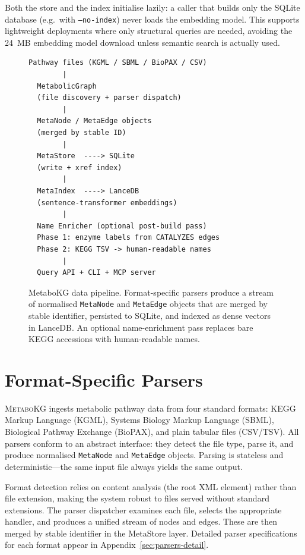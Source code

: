 \documentclass[10pt]{article}
\begin{document}
Both the store and the index initialise lazily: a caller that builds only the
SQLite database (e.g.\ with \texttt{--no-index}) never loads the embedding
model. This supports lightweight deployments where only structural queries are
needed, avoiding the 24~MB embedding model download unless semantic search is
actually used.

\begin{figure}[H]
  \centering
  \begin{lstlisting}[style=bash, frame=single, caption={High-level data flow.}]
Pathway files (KGML / SBML / BioPAX / CSV)
        |
  MetabolicGraph
  (file discovery + parser dispatch)
        |
  MetaNode / MetaEdge objects
  (merged by stable ID)
        |
  MetaStore  ----> SQLite
  (write + xref index)
        |
  MetaIndex  ----> LanceDB
  (sentence-transformer embeddings)
        |
  Name Enricher (optional post-build pass)
  Phase 1: enzyme labels from CATALYZES edges
  Phase 2: KEGG TSV -> human-readable names
        |
  Query API + CLI + MCP server
  \end{lstlisting}
  \caption{MetaboKG data pipeline. Format-specific parsers produce a stream of
  normalised \texttt{MetaNode} and \texttt{MetaEdge} objects that are merged
  by stable identifier, persisted to SQLite, and indexed as dense vectors in
  LanceDB. An optional name-enrichment pass replaces bare KEGG accessions with
  human-readable names.}
  \label{fig:arch}
\end{figure}

\section{Format-Specific Parsers}
\label{sec:parsers}

\textsc{MetaboKG} ingests metabolic pathway data from four standard formats:
KEGG Markup Language (KGML), Systems Biology Markup Language (SBML), Biological
Pathway Exchange (BioPAX), and plain tabular files (CSV/TSV). All parsers
conform to an abstract interface: they detect the file type, parse it, and
produce normalised \texttt{MetaNode} and \texttt{MetaEdge} objects. Parsing is
stateless and deterministic---the same input file always yields the same
output.

Format detection relies on content analysis (the root XML element) rather than
file extension, making the system robust to files served without standard
extensions. The parser dispatcher examines each file, selects the appropriate
handler, and produces a unified stream of nodes and edges. These are then
merged by stable identifier in the MetaStore layer. Detailed parser
specifications for each format appear in Appendix~\ref{sec:parsers-detail}.
\end{document}
